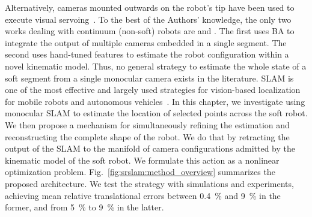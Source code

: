 %
%
%
%
%
%
%
Alternatively, cameras mounted outwards on the robot's tip have been used to execute visual servoing~\citep{homberg2019robust, wang2013visual}.
%
To the best of the Authors' knowledge, the only two works dealing with continuum (non-soft) robots are \citep{weber2012multi} and \citep{cheng2020approximate}.
% 
The first uses \gls{BA} to integrate the output of multiple cameras embedded in a single segment. The second uses hand-tuned features to estimate the robot configuration within a novel kinematic model. Thus, no general strategy to estimate the whole state of a soft segment from a single monocular camera exists in the literature.
%
\gls{SLAM} is one of the most effective and largely used strategies for vision-based localization for mobile robots and autonomous vehicles~\citep{fuentes2015visual,mur2017orb}. %
%
In this chapter, we investigate using monocular \gls{SLAM} to estimate the location of selected points across the soft robot. We then propose a mechanism for simultaneously refining the estimation and reconstructing the complete shape of the robot. We do that by retracting the output of the \gls{SLAM} to the manifold of camera configurations admitted by the kinematic model of the soft robot. We formulate this action as a nonlinear optimization problem. Fig.~\ref{fig:srslam:method_overview} summarizes the proposed architecture. We test the strategy with simulations and experiments, achieving mean relative translational errors between \SI{0.4}{\percent} and \SI{9}{\percent} in the former, and from \SI{5}{\percent} to \SI{9}{\percent} in the latter.


